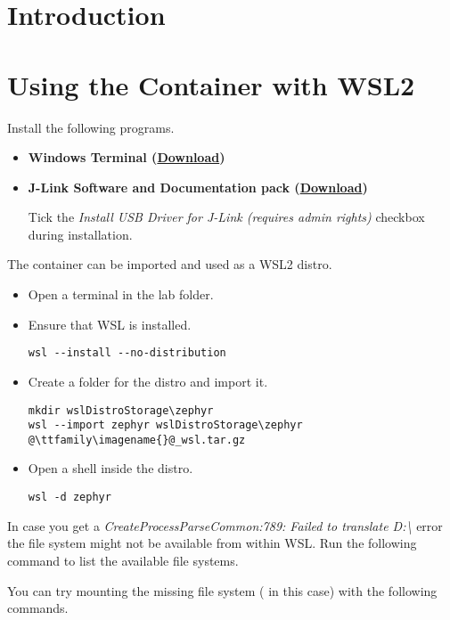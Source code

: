 



\puttitle{}

\section{Introduction}

\newpage

\section{Using the Container with WSL2}

Install the following programs.

\begin{itemize}
  \item \textbf{Windows Terminal (\href{https://aka.ms/terminal}{Download})}
  \item \textbf{J-Link Software and Documentation pack
          (\href{https://www.segger.com/downloads/jlink/JLink_Windows_x86_64.exe}{Download})}

        Tick the \emph{Install USB Driver for J-Link (requires admin rights)} checkbox
        during installation.
\end{itemize}

The container can be imported and used as a WSL2 distro.

\begin{itemize}
\item Open a terminal in the lab folder.
\item Ensure that WSL is installed.
\begin{lstlisting}
wsl --install --no-distribution
\end{lstlisting}
\item Create a folder for the distro and import it.
\begin{lstlisting}
mkdir wslDistroStorage\zephyr
wsl --import zephyr wslDistroStorage\zephyr @\ttfamily\imagename{}@_wsl.tar.gz
\end{lstlisting}
\item Open a shell inside the distro.
\begin{lstlisting}
wsl -d zephyr
\end{lstlisting}
\end{itemize}

\begin{infobox}
  In case you get a
  \emph{CreateProcessParseCommon:789: Failed to translate D:\textbackslash}
  error the file system might not be available from within WSL.
  Run the following command to list the available file systems.


  You can try mounting the missing file system ( in this case) with
  the following commands.


\end{infobox}

